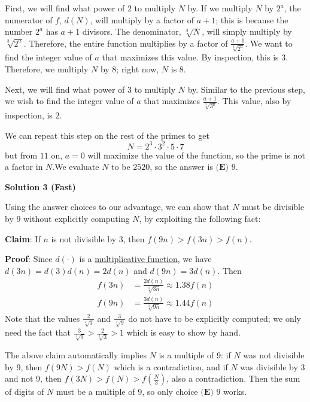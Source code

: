\begin{enumerate}
 First, we will find what power of $2$ to multiply $N$ by. If we multiply $N$ by $2^{a}$, the numerator of $f$, $d(N)$, will multiply by a factor of $a+1$; this is because the number $2^{a}$ has $a+1$ divisors. The denominator, $\sqrt[3]{N}$, will simply multiply by $\sqrt[3]{2^{a}}$. Therefore, the entire function multiplies by a factor of $\frac{a+1}{\sqrt[3]{2^{a}}}$. We want to find the integer value of $a$ that maximizes this value. By inspection, this is $3$. Therefore, we multiply $N$ by $8$; right now, $N$ is $8$.

 Next, we will find what power of $3$ to multiply $N$ by. Similar to the previous step, we wish to find the integer value of $a$ that maximizes $\frac{a+1}{\sqrt[3]{3^{a}}}$. This value, also by inspection, is $2$.

 We can repeat this step on the rest of the primes to get
 \[N = 2^{3} \cdot 3^{2} \cdot 5 \cdot 7\]but from $11$ on, $a=0$ will maximize the value of the function, so the prime is not a factor in $N$.We evaluate $N$ to be $2520$, so the answer is $\boxed{\textbf{(E) }9}$.

 



\textbf{Solution 3 (Fast)}

Using the answer choices to our advantage, we can show that $N$ must be divisible by 9 without explicitly computing $N$, by exploiting the following fact:

 \textbf{Claim}: If $n$ is not divisible by 3, then $f(9n) > f(3n) > f(n)$.

 \textbf{Proof}: Since $d(\cdot)$ is a \href{https://artofproblemsolving.com/wiki/index.php?title=Multiplicative\_function}{multiplicative function}, we have $d(3n) = d(3)d(n) = 2d(n)$ and $d(9n) = 3d(n)$. Then
 \begin{align*} f(3n) &= \frac{2d(n)}{\sqrt[3]{3n}} \approx 1.38 f(n)\\ f(9n) &= \frac{3d(n)}{\sqrt[3]{9n}} \approx 1.44 f(n) \end{align*}
Note that the values $\frac{2}{\sqrt[3]{3}}$ and $\frac{3}{\sqrt[3]{9}}$ do not have to be explicitly computed; we only need the fact that $\frac{3}{\sqrt[3]{9}} > \frac{2}{\sqrt[3]{3}} > 1$ which is easy to show by hand.

 The above claim automatically implies $N$ is a multiple of 9: if $N$ was not divisible by 9, then $f(9N) > f(N)$ which is a contradiction, and if $N$ was divisible by 3 and not 9, then $f(3N) > f(N) > f\left(\frac{N}{3}\right)$, also a contradiction. Then the sum of digits of $N$ must be a multiple of 9, so only choice $\boxed{\textbf{(E) } 9}$ works.


\end{enumerate}
